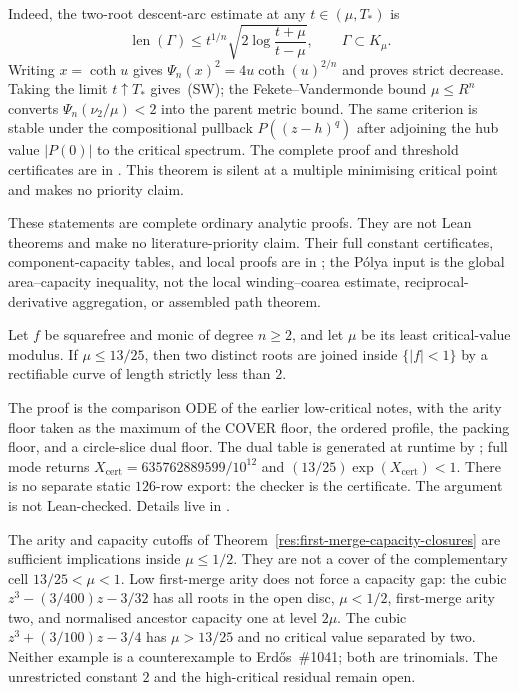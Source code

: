 Indeed, the two-root descent-arc estimate at any $t\in(\mu,T_*)$ is
\[
 \operatorname{len}(\Gamma)
 \le t^{1/n}\sqrt{2\log\frac{t+\mu}{t-\mu}},
 \qquad \Gamma\subset K_\mu.
\]
Writing $x=\coth u$ gives
$\Psi_n(x)^2=4u\coth(u)^{2/n}$ and proves strict decrease.  Taking the limit
$t\uparrow T_*$ gives~(SW); the Fekete--Vandermonde bound
$\mu\le R^n$ converts $\Psi_n(\nu_2/\mu)<2$ into the parent metric bound.
The same criterion is stable under the compositional pullback
$P((z-h)^q)$ after adjoining the hub value $|P(0)|$ to the critical spectrum.
The complete proof and threshold certificates are in
.  This theorem is
silent at a multiple minimising critical point and makes no priority claim.

These statements are complete ordinary analytic proofs.  They are not Lean
theorems and make no literature-priority claim.  Their full constant
certificates, component-capacity tables, and local proofs are in
; the
P\'olya input is the global area--capacity inequality, not the local
winding--coarea estimate, reciprocal-derivative aggregation, or assembled
path theorem.

\begin{theorem}
\label{res:low-critical-thirteen-twentyfifths}
Let $f$ be squarefree and monic of degree $n\ge2$, and let $\mu$ be its least
critical-value modulus.  If $\mu\le13/25$, then two distinct roots are joined
inside $\{|f|<1\}$ by a rectifiable curve of length strictly less than $2$.
\end{theorem}

The proof is the comparison ODE of the earlier low-critical notes, with the
arity floor taken as the maximum of the COVER floor, the ordered profile, the
packing floor, and a circle-slice dual floor.  The dual table is generated at
runtime by
;
full mode returns
$X_{\mathrm{cert}}=635762889599/10^{12}$ and $(13/25)\exp(X_{\mathrm{cert}})<1$.
There is no separate static $126$-row export: the checker is the certificate.
The argument is not Lean-checked.  Details live in
.

The arity and capacity cutoffs of
Theorem~\ref{res:first-merge-capacity-closures} are sufficient implications
inside $\mu\le1/2$.  They are not a cover of the complementary cell
$13/25<\mu<1$.  Low first-merge arity does not force a capacity gap: the
cubic $z^3-(3/400)z-3/32$ has all roots in the open disc, $\mu<1/2$, first-merge
arity two, and normalised ancestor capacity one at level $2\mu$.  The cubic
$z^3+(3/100)z-3/4$ has $\mu>13/25$ and no critical value separated by two.
Neither example is a counterexample to Erd\H{o}s~\#1041; both are trinomials.
The unrestricted constant $2$ and the high-critical residual remain open.



